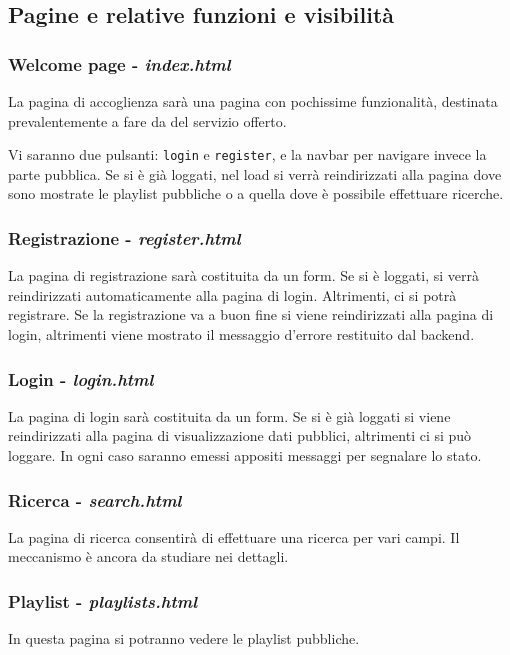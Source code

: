 \subsection{Pagine e relative funzioni e visibilità}
\subsubsection{Welcome page - \textit{index.html}}
La pagina di accoglienza sarà una pagina con pochissime funzionalità, destinata prevalentemente a fare da  del servizio offerto.

Vi saranno due pulsanti: \verb|login| e \verb|register|, e la navbar per navigare invece la parte pubblica. Se si è già loggati, nel load si verrà reindirizzati alla pagina dove sono mostrate le playlist pubbliche o a quella dove è possibile effettuare ricerche.

\subsubsection{Registrazione - \textit{register.html}}
La pagina di registrazione sarà costituita da un form. Se si è loggati, si verrà reindirizzati automaticamente alla pagina di login. Altrimenti, ci si potrà registrare. Se la registrazione va a buon fine si viene reindirizzati alla pagina di login, altrimenti viene mostrato il messaggio d'errore restituito dal backend.

\subsubsection{Login - \textit{login.html}}
La pagina di login sarà costituita da un form. Se si è già loggati si viene reindirizzati alla pagina di visualizzazione dati pubblici, altrimenti ci si può loggare. In ogni caso saranno emessi appositi messaggi per segnalare lo stato.

\subsubsection{Ricerca - \textit{search.html}}
La pagina di ricerca consentirà di effettuare una ricerca per vari campi. Il meccanismo è ancora da studiare nei dettagli.

\subsubsection{Playlist - \textit{playlists.html}}
In questa pagina si potranno vedere le playlist pubbliche.

